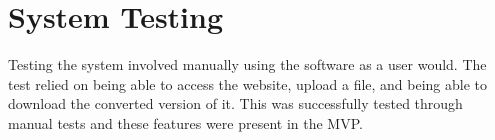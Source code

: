 
\section{System Testing}
Testing the system involved manually using the software as a user would.
The test relied on being able to access the website, upload a file, and being able to download the converted version of it.
This was successfully tested through manual tests and these features were present in the MVP.